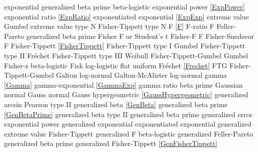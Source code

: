 exponential generalized beta prime 	\dotfill	beta-logistic					\ncite	%
exponential power				\dotfill	\eqref{ExpPower}					\ncite
exponential ratio				\dotfill	\eqref{ExpRatio}					\ncite	%
exponentiated exponential		\dotfill	\eqref{ExpExp}						\ncite	%
extreme value					\dotfill	Gumbel 								\ncite
extreme value type N 			\dotfill	Fisher-Tippett type N 				\ncite	%
%
F								\dotfill	\eqref{F} 							\ncite	%
F-ratio							\dotfill	F									\ncite	%
Feller-Pareto					\dotfill	generalized beta prime 				\ncite	%
Fisher							\dotfill	F or Student's t 					\ncite	%
Fisher-F 						\dotfill	F 									\ncite	%
Fisher-Snedecor 				\dotfill	F 									\ncite	%
Fisher-Tippett					\dotfill	\eqref{FisherTippett} 				\ncite	%
Fisher-Tippett type I			\dotfill	Gumbel 								\ncite	%
Fisher-Tippett type II			\dotfill	Fr\'{e}chet  						\ncite	%
Fisher-Tippett type III			\dotfill	Weibull 							\ncite	%
Fisher-Tippett-Gumbel			\dotfill	Gumbel  							\ncite	%
Fisher-z						\dotfill	beta-logistic						\ncite	%
Fisk							\dotfill	log-logistic						\ncite 	%
flat 							\dotfill	uniform 							\ncite	%
Fr\'{e}chet 					\dotfill	\eqref{Frechet} 					\ncite	%
FTG								\dotfill	Fisher-Tippett-Gumbel 				\ncite	%
%
Galton							\dotfill	log-normal 							\ncite	%
Galton-McAlister				\dotfill	log-normal 							\ncite	%
gamma							\dotfill	\eqref{Gamma} 						\ncite	%
gamma-exponential				\dotfill	\eqref{GammaExp}					\ncite	%
gamma ratio						\dotfill	beta prime							\ncite	%
Gaussian 						\dotfill	normal 								\ncite	%
Gauss 							\dotfill	normal 								\ncite	%
Gauss hypergeometric			\dotfill	\eqref{GaussHypergeometric}			\ncite
generalized arcsin				\dotfill	Pearson type II 					   	%
generalized beta 				\dotfill	\eqref{GenBeta} 					\ncite	%
generalized beta prime 			\dotfill	\eqref{GenBetaPrime} 				 %
generalized beta type II		\dotfill	generalized beta prime				
generalized error				\dotfill	exponential power					\ncite
generalized exponential			\dotfill	exponentiated exponential 			    %
generalized extreme value		\dotfill	Fisher-Tippett						\ncite	%
generalized F					\dotfill	beta-logistic 						\ncite	%
generalized Feller-Pareto		\dotfill	generalized beta prime				
generalized Fisher-Tippett		\dotfill	\eqref{GenFisherTippett} 			\ncite	%
